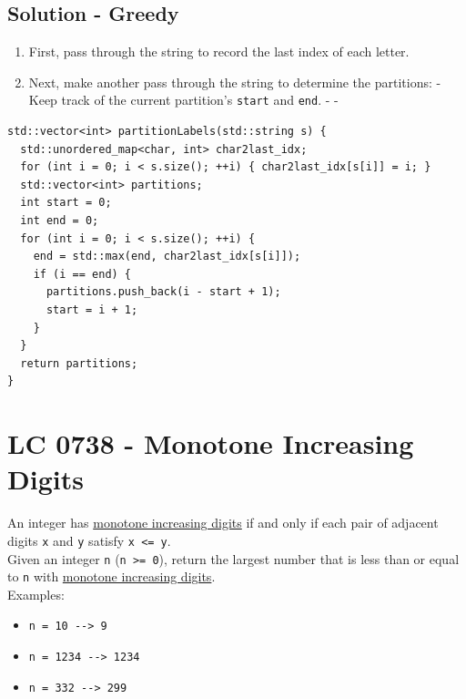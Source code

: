 \subsection*{Solution - Greedy}
\begin{enumerate}
\item First, pass through the string to record the last index of each letter.
\item Next, make another pass through the string to determine the partitions:
  \subitem - Keep track of the current partition's {\colorbox{CodeBackground}{\lstinline|start|}} and {\colorbox{CodeBackground}{\lstinline|end|}}.
  \subitem - {\color{magenta}{For each letter, set the last index of the letters as the end of the current partition.}}
  \subitem - {}
\end{enumerate}
\begin{lstlisting}
std::vector<int> partitionLabels(std::string s) {
  std::unordered_map<char, int> char2last_idx;
  for (int i = 0; i < s.size(); ++i) { char2last_idx[s[i]] = i; }
  std::vector<int> partitions;
  int start = 0;
  int end = 0;
  for (int i = 0; i < s.size(); ++i) {
    end = std::max(end, char2last_idx[s[i]]);
    if (i == end) {
      partitions.push_back(i - start + 1);
      start = i + 1;
    }
  }
  return partitions;
}
\end{lstlisting}

\section{LC 0738 - Monotone Increasing Digits}
An integer has \ul{monotone increasing digits} if and only if each pair of adjacent digits {\colorbox{CodeBackground}{\lstinline|x|}} and {\colorbox{CodeBackground}{\lstinline|y|}} satisfy {\colorbox{CodeBackground}{\lstinline|x <= y|}}.\\

Given an integer {\colorbox{CodeBackground}{\lstinline|n|}} ({\colorbox{CodeBackground}{\lstinline|n >= 0|}}), return the largest number that is less than or equal to {\colorbox{CodeBackground}{\lstinline|n|}} with \ul{monotone increasing digits}.\\

Examples:
\begin{itemize}
\item {\colorbox{CodeBackground}{\lstinline|n = 10 --> 9|}}
\item {\colorbox{CodeBackground}{\lstinline|n = 1234 --> 1234|}}
\item {\colorbox{CodeBackground}{\lstinline|n = 332 --> 299|}}
\end{itemize}

